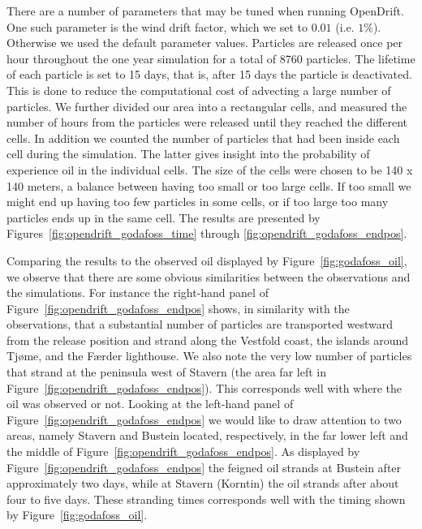 There are a number of parameters that may be tuned when running OpenDrift. One such parameter is the wind drift factor, which we set to $0.01$ (i.e. $1\%$). Otherwise we used the default parameter values. Particles are released once per hour throughout the one year simulation for a total of 8760 particles. The lifetime of each particle is set to 15 days, that is, after 15 days the particle is deactivated. This is done to reduce the computational cost of advecting a large number of particles. We further divided our area into a rectangular cells, and measured the number of hours from the particles were released until they reached the different cells. In addition we counted the number of particles that had been inside each cell during the simulation. The latter gives insight into the probability of experience oil in the individual cells. The size of the cells were chosen to be 140 x 140 meters, a balance between having too small or too large cells. If too small we might end up having too few particles in some cells, or if too large too many particles ends up in the same cell. The results are presented by Figures~\ref{fig:opendrift_godafoss_time} through \ref{fig:opendrift_godafoss_endpos}.



Comparing the results to the observed oil displayed by Figure~\ref{fig:godafoss_oil}, we observe that there are some obvious similarities between the observations and the simulations. For instance the right-hand panel of Figure~\ref{fig:opendrift_godafoss_endpos} shows, in similarity with the observations, that a substantial number of particles are transported westward from the release position and strand along the Vestfold coast, the islands around Tj{\o}me, and the F{\ae}rder lighthouse. We also note the very low number of particles that strand at the peninsula west of Stavern (the area far left in Figure~\ref{fig:opendrift_godafoss_endpos}). This corresponds well with where the oil was observed or not. Looking at the left-hand panel of Figure~\ref{fig:opendrift_godafoss_endpos} we would like to draw attention to two areas, namely Stavern and Bustein located, respectively, in the far lower left and the middle of Figure~\ref{fig:opendrift_godafoss_endpos}. As displayed by Figure~\ref{fig:opendrift_godafoss_endpos} the feigned oil strands at Bustein after approximately two days, while at Stavern (Korntin) the oil strands after about four to five days. These stranding times corresponds well with the timing shown by Figure~\ref{fig:godafoss_oil}.


